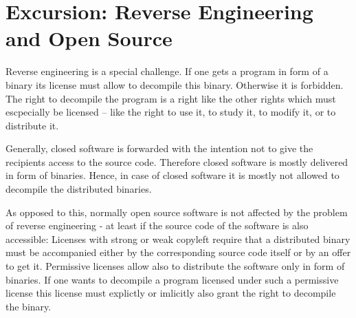 %
%
%
%
%



\section{Excursion: Reverse Engineering and Open Source}

Reverse engineering is a special challenge. If one gets a program in form
of a binary its license must allow to decompile this binary. Otherwise it is
forbidden. The right to decompile the program is a right like the other rights
which must escpecially be licensed -- like the right to use it, to study it, to
modify it, or to distribute it.

Generally, closed software is forwarded with the intention not to give the
recipients access to the source code. Therefore closed software is mostly
delivered in form of binaries. Hence, in case of closed software it is mostly
not allowed to decompile the distributed binaries.

As opposed to this, normally open source software is not affected by the problem
of reverse engineering - at least if the source code of the software is also
accessible: Licenses with strong or weak copyleft require that a distributed
binary must be accompanied either by the corresponding source code itself or by
an offer to get it. Permissive licenses allow also to distribute the software
only in form of binaries. If one wants to decompile a program licensed under
such a permissive license this license must explictly or imlicitly also grant
the right to decompile the binary.


